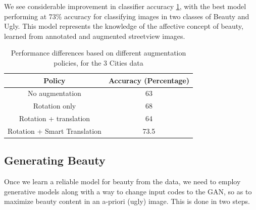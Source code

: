 We see considerable improvement in classifier accuracy \ref{tab:classifier}, with the best model performing at 73\% accuracy for classifying images in two classes of Beauty and Ugly. 
This model represents the knowledge of the affective concept of beauty, learned from annotated and augmented streetview images. 


\begin{table}[h]
	\centering
	\begin{tabular}{|c|c|}
		\hline
		\textbf{Policy} & \textbf{Accuracy (Percentage)}\\
		\hline
		No augmentation & 63 \\
		\hline
		Rotation only & 68 \\
		\hline
		Rotation + translation  & 64 \\
		\hline
		Rotation + Smart Translation & 73.5 \\
		\hline
		
		\hline
	\end{tabular}
	\caption{Performance differences based on different augmentation policies, for the 3 Cities data}
	\label{tab:classifier}
\end{table}


\subsection{Generating Beauty}
Once we learn a reliable model for beauty from the data, we need to employ generative models along with a way to change input codes to the GAN, so as to maximize beauty content in an a-priori (ugly) image. This is done in two steps. 

